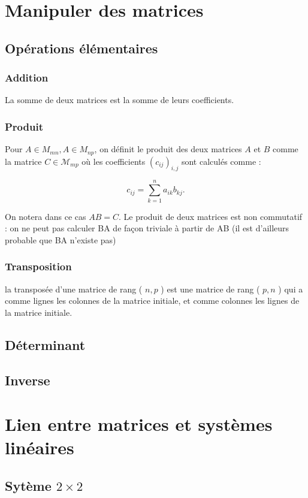 \section{Manipuler des matrices}
\subsection{Opérations élémentaires}
\subsubsection*{Addition}
La somme de deux matrices est la somme de leurs coefficients.

\subsubsection*{Produit}

Pour $A \in M_{m n}, A \in M_{n p}$, on définit le produit des deux matrices $A$ et $B$ comme la matrice $C \in \mathcal{M}_{m p}$ où les coefficients $\left(c_{i j}\right)_{i, j}$ sont calculés comme :

$$
c_{i j}=\sum_{k=1}^n a_{i k} b_{k j} .
$$


On notera dans ce cas $A B=C$. Le produit de deux matrices est non commutatif : on ne peut pas calculer BA de façon triviale à partir de AB (il est d'ailleurs probable que BA n'existe pas)

\subsubsection*{Transposition}
la transposée d'une matrice de rang ( $n, p$ ) est une matrice de rang ( $p, n$ ) qui a comme lignes les colonnes de la matrice initiale, et comme colonnes les lignes de la matrice initiale.

\subsection{Déterminant}
\subsection{Inverse}


\section{Lien entre matrices et systèmes linéaires}

\subsection{Sytème $2 \times 2$}

